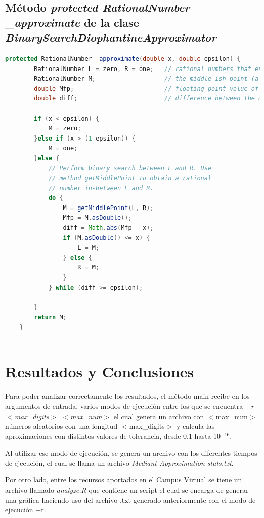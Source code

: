 \documentclass[11pt,letterpaper]{article}
\begin{document}
\subsection{Método \textit{protected RationalNumber \_approximate} de la clase \textit{BinarySearchDiophantineApproximator}} \label{ch:32}
\begin{lstlisting}[language = java]
	protected RationalNumber _approximate(double x, double epsilon) {
		RationalNumber L = zero, R = one;	// rational numbers that enclose x
		RationalNumber M;					// the middle-ish point (a rational number between L and R).
		double Mfp;							// floating-point value of the middle-ish point
		double diff;						// difference between the middle-ish point and |x|
		
		if (x < epsilon) { 					
			M = zero;						
		}else if (x > (1-epsilon)) {		
			M = one;
		}else {
			// Perform binary search between L and R. Use
			// method getMiddlePoint to obtain a rational
			// number in-between L and R.
			do {
				M = getMiddlePoint(L, R);
				Mfp = M.asDouble();
				diff = Math.abs(Mfp - x);
				if (M.asDouble() <= x) {
					L = M;
				} else {
					R = M;
				}
			} while (diff >= epsilon);
			
		}
		return M;
	}
	
\end{lstlisting}

\section{Resultados y Conclusiones}
Para poder analizar correctamente los resultados, el método main recibe en los argumentos de entrada, varios modos de ejecución entre los que se encuentra \textit{$-$r $<$max\_digits$>$ $<$max\_num$>$} el cual genera un archivo con $<$max\_num$>$ números aleatorios con una longitud $<$max\_digits$>$ y calcula las aproximaciones con distintos valores de tolerancia, desde 0.1 hasta 10$^{-16}$.

Al utilizar ese modo de ejecución, se genera un archivo con los diferentes tiempos de ejecución, el cual se llama  un archivo \textit{Mediant-Approximation-stats.txt}.

Por otro lado, entre los recursos aportados en el Campus Virtual se tiene un archivo llamado \textit{analyze.R} que contiene un script el cual se encarga de generar una gráfica haciendo uso del archivo .txt generado anteriormente con el modo de ejecución $-$r.
\end{document}
